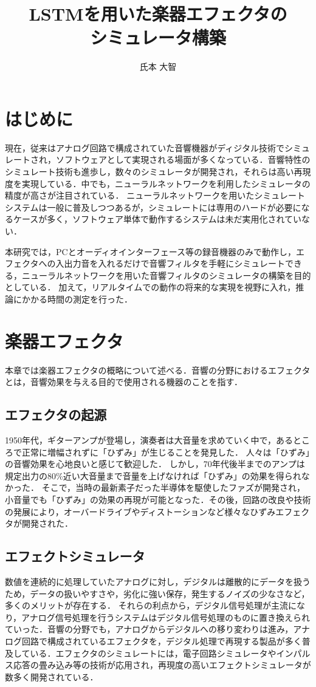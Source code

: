 \documentclass{jreport}		%
\title{LSTMを用いた楽器エフェクタの\\シミュレータ構築}	%
\author{氏本 大智}		%
\begin{document}
%
\maketitle		%
\tableofcontents	%
\thispagestyle{empty}
\setcounter{page}{0}

\chapter{はじめに}
現在，従来はアナログ回路で構成されていた音響機器がディジタル技術でシミュレートされ，ソフトウェアとして実現される場面が多くなっている．音響特性のシミュレート技術も進歩し，数々のシミュレータが開発され，それらは高い再現度を実現している．中でも，ニューラルネットワークを利用したシミュレータの精度が高さが注目されている．
ニューラルネットワークを用いたシミュレートシステムは一般に普及しつつあるが，シミュレートには専用のハードが必要になるケースが多く，ソフトウェア単体で動作するシステムは未だ実用化されていない．

本研究では，PCとオーディオインターフェース等の録音機器のみで動作し，エフェクタへの入出力音を入れるだけで音響フィルタを手軽にシミュレートできる，ニューラルネットワークを用いた音響フィルタのシミュレータの構築を目的としている．
加えて，リアルタイムでの動作の将来的な実現を視野に入れ，推論にかかる時間の測定を行った．

\chapter{楽器エフェクタ}
本章では楽器エフェクタの概略について述べる．音響の分野におけるエフェクタとは，音響効果を与える目的で使用される機器のことを指す．

\section{エフェクタの起源}
1950年代，ギターアンプが登場し，演奏者は大音量を求めていく中で，あるところで正常に増幅されずに「ひずみ」が生じることを発見した．
人々は「ひずみ」の音響効果を心地良いと感じて歓迎した．
しかし，70年代後半までのアンプは規定出力の80\%近い大音量まで音量を上げなければ「ひずみ」の効果を得られなかった．
そこで，当時の最新素子だった半導体を駆使したファズが開発され，小音量でも「ひずみ」の効果の再現が可能となった．その後，回路の改良や技術の発展により，オーバードライブやディストーションなど様々なひずみエフェクタが開発された．\cite{sinco}

\section{エフェクトシミュレータ}
数値を連続的に処理していたアナログに対し，デジタルは離散的にデータを扱うため，データの扱いやすさや，劣化に強い保存，発生するノイズの少なさなど，多くのメリットが存在する．
それらの利点から，デジタル信号処理が主流になり，アナログ信号処理を行うシステムはデジタル信号処理のものに置き換えられていった．音響の分野でも，アナログからデジタルへの移り変わりは進み，アナログ回路で構成されているエフェクタを，デジタル処理で再現する製品が多く普及している．エフェクタのシミュレートには，電子回路シミュレータやインパルス応答の畳み込み等の技術が応用され，再現度の高いエフェクトシミュレータが数多く開発されている．
\end{document}
